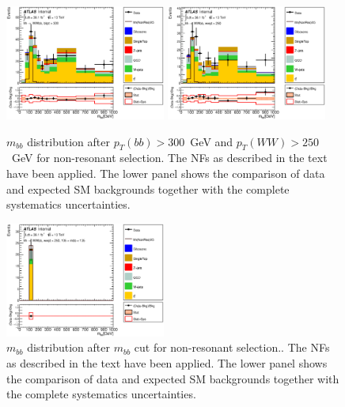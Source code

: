 \begin{figure}[!h]
\begin{center}
\includegraphics*[width=0.47\textwidth] {figures/Unblinded_mbb/C_reOptNonRes_mww_bbpt210_bbpt300_bbMass_regionA_met25d020.eps}
\includegraphics*[width=0.47\textwidth] {figures/Unblinded_mbb/C_reOptNonRes_mww_bbpt210_bbpt300_wwpt250_bbMass_regionA_met25d020.eps}
\caption[$m_{bb}$ distribution after $p_{T}(bb) > 300$~GeV and $p_{T}(WW) > 250$~GeV for non-resonant selection.]{$m_{bb}$ distribution after $p_{T}(bb) > 300$~GeV and $p_{T}(WW) > 250$~GeV for non-resonant selection. The NFs as described in the text have been applied. The lower panel shows the comparison of data and expected SM backgrounds together with the complete systematics uncertainties.}
\end{center}
\end{figure}

\begin{figure}[!h]
\begin{center}
\includegraphics*[width=0.47\textwidth] {figures/Unblinded_mbb/C_reOptNonRes_mww_bbpt210_bbpt300_wwpt250_mbb_bbMass_regionA_met25d020.eps}
\caption[$m_{bb}$ distribution after $m_{bb}$ cut for non-resonant selection.]{$m_{bb}$ distribution after $m_{bb}$ cut for non-resonant selection.. The NFs as described in the text have been applied. The lower panel shows the comparison of data and expected SM backgrounds together with the complete systematics uncertainties.}
\end{center}
\end{figure}

